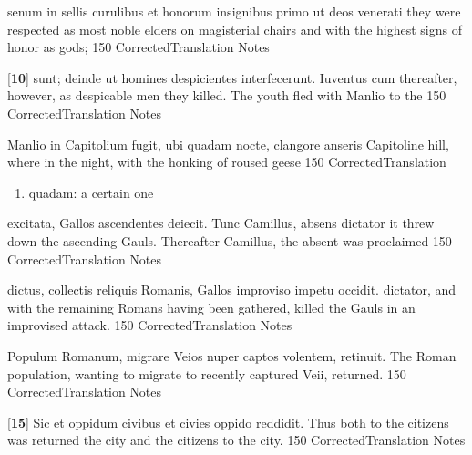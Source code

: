\latline
  {senum in sellis curulibus et honorum insignibus primo ut deos venerati}
  { they were respected as most noble elders on magisterial chairs and with the highest signs of honor as gods; }
  {150}
  { CorrectedTranslation }
  { Notes }


\latline
  {[\textbf{10}] sunt; deinde ut homines despicientes interfecerunt.  Iuventus cum}
  { thereafter, however, as despicable men they killed.  The youth fled with Manlio to the }
  {150}
  { CorrectedTranslation }
  { Notes }


\latline
  {Manlio in Capitolium fugit, ubi quadam nocte, clangore anseris}
  { Capitoline hill, where in the night, with the honking of roused geese }
  {150}
  { CorrectedTranslation }
  { \begin{enumerate}
  	\item quadam:  a certain one
  \end{enumerate} }


\latline
  {excitata, Gallos ascendentes deiecit.  Tunc Camillus, absens dictator}
  { it threw down the ascending Gauls.  Thereafter Camillus, the absent was proclaimed }
  {150}
  { CorrectedTranslation }
  { Notes }


\latline
  {dictus, collectis reliquis Romanis, Gallos improviso impetu occidit.}
  { dictator, and with the remaining Romans having been gathered, killed the Gauls in an improvised attack. }
  {150}
  { CorrectedTranslation }
  { Notes }


\latline
  {Populum Romanum, migrare Veios nuper captos volentem, retinuit.}
  { The Roman population, wanting to migrate to recently captured Veii, returned. }
  {150}
  { CorrectedTranslation }
  { Notes }


\latline
  {[\textbf{15}] Sic et oppidum civibus et civies oppido reddidit.}
  { Thus both to the citizens was returned the city and the citizens to the city. }
  {150}
  { CorrectedTranslation }
  { Notes }



